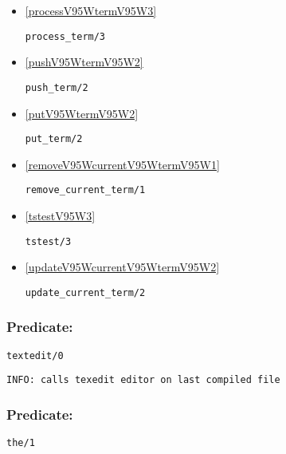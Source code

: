 \begin{itemize}
\item \ref{processV95WtermV95W3} 
\begin{verbatim}
process_term/3
\end{verbatim}

\item \ref{pushV95WtermV95W2} 
\begin{verbatim}
push_term/2
\end{verbatim}

\item \ref{putV95WtermV95W2} 
\begin{verbatim}
put_term/2
\end{verbatim}

\item \ref{removeV95WcurrentV95WtermV95W1} 
\begin{verbatim}
remove_current_term/1
\end{verbatim}

\item \ref{tstestV95W3} 
\begin{verbatim}
tstest/3
\end{verbatim}

\item \ref{updateV95WcurrentV95WtermV95W2} 
\begin{verbatim}
update_current_term/2
\end{verbatim}

\end{itemize}

\subsubsection{Predicate:} \label{texteditV95W0}

\begin{verbatim}
textedit/0
\end{verbatim}

{\small \begin{verbatim}
INFO: calls texedit editor on last compiled file

\end{verbatim}}

\subsubsection{Predicate:} \label{theV95W1}

\begin{verbatim}
the/1
\end{verbatim}

